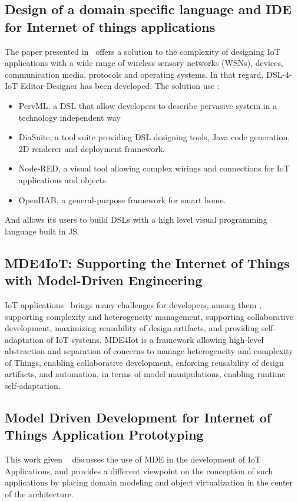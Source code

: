 \subsection*{Design of a domain specific language and IDE for Internet of things applications}
The paper presented in~\cite{designDSLandIDEforIOTa} offers a solution to the complexity of designing IoT applications with a wide range of wireless sensory networks (WSNs), devices, communication media, protocols and operating systems. In that regard, DSL-4-IoT Editor-Designer has been developed. The solution use : 
\begin{itemize}
    \item 
PervML,  a DSL that allow developers to describe pervasive system in a technology independent way 
\item
DiaSuite, a tool suite providing DSL designing tools, Java code generation, 2D renderer and deployment framework. 
\item
Node-RED, a visual tool allowing complex wirings and connections for IoT applications and objects.
\item
OpenHAB, a general-purpose framework for smart home.
\end{itemize}
And allows its users to build DSLs with a high level visual programming language built in JS.

\subsection*{MDE4IoT: Supporting the Internet of Things with Model-Driven Engineering}
IoT applications~\cite{MDE4IOT} brings many challenges for developers, among them , supporting complexity and heterogeneity management, supporting collaborative development, maximizing reusability of design artifacts, and providing self-adaptation of IoT systems. MDE4Iot is a framework allowing  high-level abstraction and separation of concerns to manage heterogeneity and complexity of Things, enabling collaborative development, enforcing reusability of design artifacts, and automation, in terms of model manipulations, enabling runtime self-adaptation. 

\subsection*{Model Driven Development for Internet of Things Application Prototyping}
This work given ~\cite{MDE4IOTApplicationPrototyping} discusses the use of MDE in the development of IoT Applications, and provides a different viewpoint on the conception of such applications by placing domain modeling and object virtualization in the center of the architecture.

